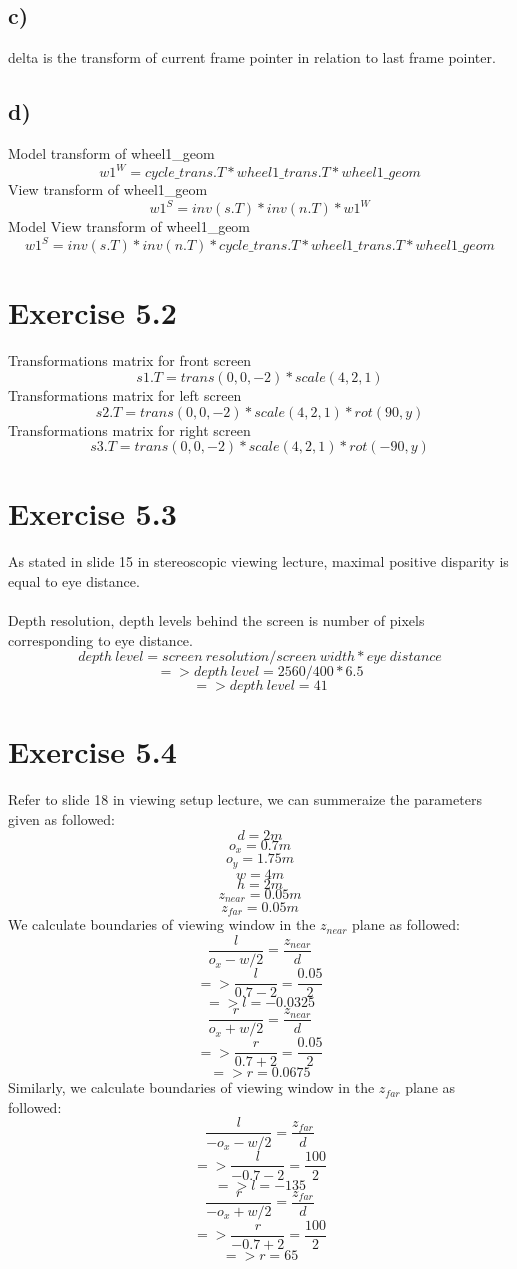\documentclass[12pt]{article}
\begin{document}
\subsection*{c)}
delta is the transform of current frame pointer in relation to last frame pointer.

\subsection*{d)}
Model transform of wheel1\_geom 
$$w1^W = cycle\_trans.T * wheel1\_trans.T * wheel1\_geom$$
View transform of wheel1\_geom 
$$w1^{S} = inv(s.T) * inv(n.T) * w1^W$$
Model View transform of wheel1\_geom 
$$w1^S = inv(s.T) * inv(n.T) * cycle\_trans.T * wheel1\_trans.T * wheel1\_geom$$

\section*{Exercise 5.2}
Transformations matrix for front screen 
$$s1.T = trans(0,0,-2) * scale(4,2,1)$$
Transformations matrix for left screen 
$$s2.T = trans(0,0,-2) * scale(4,2,1) * rot(90, y)$$
Transformations matrix for right screen 
$$s3.T = trans(0,0,-2) * scale(4,2,1) * rot(-90, y)$$

\section*{Exercise 5.3}
As stated in slide 15 in stereoscopic viewing lecture, maximal positive disparity is equal to eye distance.\\\\
Depth resolution, depth levels behind the screen is number of pixels corresponding to eye distance.\\
$$depth\:level = screen\:resolution / screen\:width * eye\:distance$$
$$=> depth\:level = 2560 / 400 * 6.5 $$
$$=> depth\:level = 41$$

\section*{Exercise 5.4}
Refer to slide 18 in viewing setup lecture, we can summeraize the parameters given as followed:
$$d = 2m$$
$$o_x = 0.7m$$
$$o_y = 1.75m$$
$$w = 4m$$
$$h = 2m$$
$$z_{near} = 0.05m$$
$$z_{far} = 0.05m$$
We calculate boundaries of viewing window in the $z_{near}$ plane as followed:
$$\frac{l}{o_x-w/2} = \frac{z_{near}}{d}$$
$$=>\frac{l}{0.7-2} = \frac{0.05}{2}$$
$$=>l = -0.0325$$
$$\frac{r}{o_x+w/2} = \frac{z_{near}}{d}$$
$$=>\frac{r}{0.7+2} = \frac{0.05}{2}$$
$$=>r = 0.0675$$
Similarly, we calculate boundaries of viewing window in the $z_{far}$ plane as followed:
$$\frac{l}{-o_x-w/2} = \frac{z_{far}}{d}$$
$$=>\frac{l}{-0.7-2} = \frac{100}{2}$$
$$=>l = -135$$
$$\frac{r}{-o_x+w/2} = \frac{z_{far}}{d}$$
$$=>\frac{r}{-0.7+2} = \frac{100}{2}$$
$$=>r = 65$$
\end{document}
